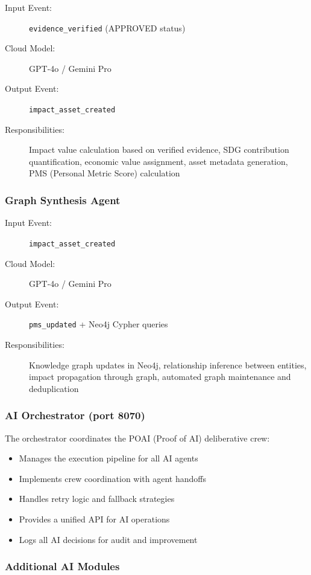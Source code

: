 \documentclass[11pt,a4paper]{article}
\begin{document}
\begin{description}
  \item[Input Event:] \texttt{evidence\_verified} (APPROVED status)
  \item[Cloud Model:] GPT-4o / Gemini Pro
  \item[Output Event:] \texttt{impact\_asset\_created}
  \item[Responsibilities:] Impact value calculation based on verified evidence, SDG contribution quantification, economic value assignment, asset metadata generation, PMS (Personal Metric Score) calculation
\end{description}

\subsubsection{Graph Synthesis Agent}

\begin{description}
  \item[Input Event:] \texttt{impact\_asset\_created}
  \item[Cloud Model:] GPT-4o / Gemini Pro
  \item[Output Event:] \texttt{pms\_updated} + Neo4j Cypher queries
  \item[Responsibilities:] Knowledge graph updates in Neo4j, relationship inference between entities, impact propagation through graph, automated graph maintenance and deduplication
\end{description}

\subsubsection{AI Orchestrator (port 8070)}

The orchestrator coordinates the POAI (Proof of AI) deliberative crew:
\begin{itemize}
  \item Manages the execution pipeline for all AI agents
  \item Implements crew coordination with agent handoffs
  \item Handles retry logic and fallback strategies
  \item Provides a unified API for AI operations
  \item Logs all AI decisions for audit and improvement
\end{itemize}

\subsubsection{Additional AI Modules}
\end{document}

